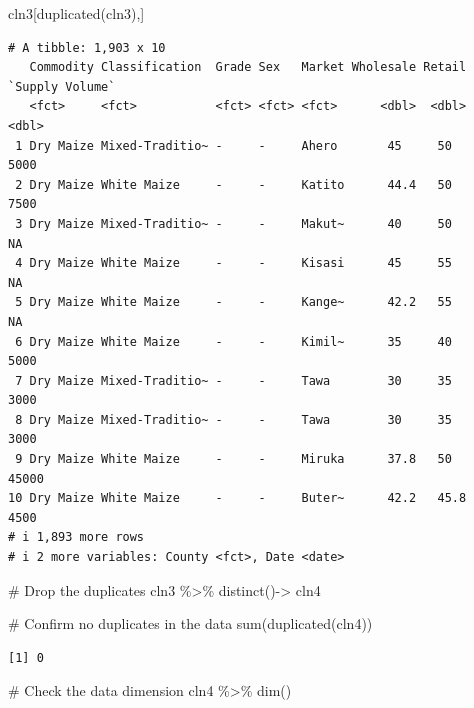 \documentclass[
  letterpaper,
  DIV=11,
  numbers=noendperiod]{scrartcl}
\newenvironment{Shaded}{\begin{snugshade}}{\end{snugshade}}
\newcommand{\CommentTok}[1]{\textcolor[rgb]{0.37,0.37,0.37}{#1}}
\newcommand{\FunctionTok}[1]{\textcolor[rgb]{0.28,0.35,0.67}{#1}}
\newcommand{\NormalTok}[1]{\textcolor[rgb]{0.00,0.23,0.31}{#1}}
\newcommand{\OtherTok}[1]{\textcolor[rgb]{0.00,0.23,0.31}{#1}}
\newcommand{\SpecialCharTok}[1]{\textcolor[rgb]{0.37,0.37,0.37}{#1}}
\begin{document}
\begin{Shaded}
\begin{Highlighting}[]
\NormalTok{cln3[}\FunctionTok{duplicated}\NormalTok{(cln3),]}
\end{Highlighting}
\end{Shaded}

\begin{verbatim}
# A tibble: 1,903 x 10
   Commodity Classification  Grade Sex   Market Wholesale Retail `Supply Volume`
   <fct>     <fct>           <fct> <fct> <fct>      <dbl>  <dbl>           <dbl>
 1 Dry Maize Mixed-Traditio~ -     -     Ahero       45     50              5000
 2 Dry Maize White Maize     -     -     Katito      44.4   50              7500
 3 Dry Maize Mixed-Traditio~ -     -     Makut~      40     50                NA
 4 Dry Maize White Maize     -     -     Kisasi      45     55                NA
 5 Dry Maize White Maize     -     -     Kange~      42.2   55                NA
 6 Dry Maize White Maize     -     -     Kimil~      35     40              5000
 7 Dry Maize Mixed-Traditio~ -     -     Tawa        30     35              3000
 8 Dry Maize Mixed-Traditio~ -     -     Tawa        30     35              3000
 9 Dry Maize White Maize     -     -     Miruka      37.8   50             45000
10 Dry Maize White Maize     -     -     Buter~      42.2   45.8            4500
# i 1,893 more rows
# i 2 more variables: County <fct>, Date <date>
\end{verbatim}

\begin{Shaded}
\begin{Highlighting}[]
\CommentTok{\# Drop the duplicates}
\NormalTok{cln3 }\SpecialCharTok{\%\textgreater{}\%} \FunctionTok{distinct}\NormalTok{()}\OtherTok{{-}\textgreater{}}\NormalTok{ cln4}

\CommentTok{\# Confirm no duplicates in the data}
\FunctionTok{sum}\NormalTok{(}\FunctionTok{duplicated}\NormalTok{(cln4))}
\end{Highlighting}
\end{Shaded}

\begin{verbatim}
[1] 0
\end{verbatim}

\begin{Shaded}
\begin{Highlighting}[]
\CommentTok{\# Check the data dimension}
\NormalTok{cln4 }\SpecialCharTok{\%\textgreater{}\%} \FunctionTok{dim}\NormalTok{()}
\end{Highlighting}
\end{Shaded}
\end{document}
